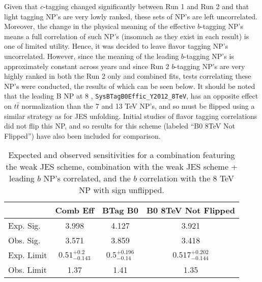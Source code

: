 Given that $c$-tagging changed significantly between Run 1 and Run 2 and that light tagging NP's are very lowly ranked, these sets of NP's are left uncorrelated.  Moreover, the change in the physical meaning of the effective $b$-tagging NP's means a full correlation of such NP's (insomuch as they exist in each result) is one of limited utility.  Hence, it was decided to leave flavor tagging NP's uncorrelated.  However, since the meaning of the leading $b$-tagging NP's is approximately constant across years and since Run 2 $b$-tagging NP's are very highly ranked in both the Run 2 only and combined fits, tests correlating these NP's were conducted, the results of which can be seen below.  It should be noted that the leading B NP at 8 \TeV, \texttt{SysBTagB0Effic\_Y2012\_8TeV}, has an opposite effect on $t\bar{t}$ normalization than the 7 and 13 TeV NP's, and so must be flipped using a similar strategy as for JES unfolding.  Initial studies of flavor tagging correlations did not flip this NP, and so results for this scheme (labeled ``B0 8TeV Not Flipped'') have also been included for comparison.

\begin{table}[htbp]
\begin{center}\begin{tabular}{lccc}
\hline\hline
 & Comb Eff & BTag B0 & B0 8TeV Not Flipped\\
\hline
Exp. Sig. & 3.998 & 4.127 & 3.921\\
Obs. Sig. &  3.571 & 3.859 & 3.418\\ %
\hline
Exp. Limit & $0.51^{+0.2}_{-0.143}$ & $0.5^{+0.196}_{-0.14}$ & $0.517^{+0.202}_{-0.144}$\\
Obs. Limit & 1.37 & 1.41 & 1.35\\
\hline
\end{tabular}
\caption{Expected and observed sensitivities for a combination featuring the weak JES scheme, combination with the weak JES scheme + leading $b$ NP's correlated, and the $b$ correlation with the 8 TeV NP with sign unflipped.}
\label{tab:ExpectedSensitivities:btag-b}
\end{center}
\end{table}

